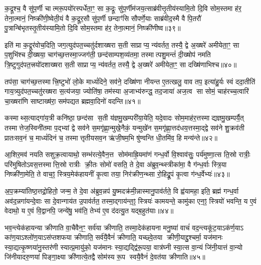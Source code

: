 {\anuvakamend[{प्रज्ञात्यै पश्यत्यनूया॒जव॒द्यज॑मा॒नोऽनु॑ पुरोनुवा॒क्यास्ता अ॒ष्टौ च॑॥५॥}]}

क॒द्रूश्च॒ वै सु॑प॒र्णी चात्मरू॒पयो॑रस्पर्धेता॒ꣳ॒ सा क॒द्रूः सु॑प॒र्णीम॑जय॒त्साब्र॑वीत्तृ॒तीय॑स्यामि॒तो दि॒वि सोम॒स्तमा ह॑र॒ तेना॒त्मानं॒ निष्क्री॑णी॒ष्वेती॒यं वै क॒द्रूर॒सौ सु॑प॒र्णी छन्दाꣳ॑सि सौपर्णे॒याः साब्र॑वीद॒स्मै वै पि॒तरौ॑ पु॒त्रान्बि॑भृतस्तृ॒तीय॑स्यामि॒तो दि॒वि सोम॒स्तमा ह॑र॒ तेना॒त्मानं॒ निष्क्री॑णीष्व॥३९॥

इति॑ मा क॒द्रूर॑वोच॒दिति॒ जग॒त्युद॑पत॒च्चतु॑र्दशाख्षरा स॒ती साप्राप्य॒ न्य॑वर्तत॒ तस्यै॒ द्वे अ॒ख्षरे॑ अमीयेता॒ꣳ॒ सा प॒शुभि॑श्च दी॒ख्षया॒ चाग॑च्छ॒त्तस्मा॒ज्जग॑ती॒ छन्द॑साम्पश॒व्य॑तमा॒ तस्मात्पशु॒मन्तं॑ दी॒ख्षोप॑ नमति त्रि॒ष्टुगुद॑पत॒त्त्रयो॑दशाख्षरा स॒ती साप्राप्य॒ न्य॑वर्तत॒ तस्यै॒ द्वे अ॒ख्षरे॑ अमीयेता॒ꣳ॒ सा दख्षि॑णाभिश्च॥४०॥

तप॑सा॒ चाग॑च्छ॒त्तस्मात्त्रि॒ष्टुभो॑ लो॒के माध्यं॑दिने॒ सव॑ने॒ दख्षि॑णा नीयन्त ए॒तत्खलु॒ वाव तप॒ इत्या॑हु॒र्यः स्वं ददा॒तीति॑ गाय॒त्र्युद॑पत॒च्चतु॑रख्षरा स॒त्य॑जया॒ ज्योति॑षा॒ तम॑स्या अ॒जाभ्य॑रुन्द्ध॒ तद॒जाया॑ अज॒त्व सा सोमं॒ चाह॑रच्च॒त्वारि॑ चा॒ख्षरा॑णि साष्टाख्ष॑रा॒ सम॑पद्यत ब्रह्मवा॒दिनो॑ वदन्ति॥४१॥

कस्माथ्स॒त्याद्गा॑य॒त्री कनि॑ष्ठा॒ छन्द॑सा स॒ती य॑ज्ञमु॒खम्परी॑या॒येति॒ यदे॒वादः सोम॒माह॑र॒त्तस्माद्यज्ञमु॒खम्पर्यै॒त् तस्मात्तेज॒स्विनी॑तमा प॒द्भ्यां द्वे सव॑ने स॒मगृ॑ह्णा॒न्मुखे॒नैकं॒ यन्मुखे॑न स॒मगृ॑ह्णा॒त्तद॑धय॒त्तस्मा॒द्द्वे सव॑ने शु॒क्रव॑ती प्रातःसव॒नं च॒ माध्यं॑दिनं च॒ तस्मात्तृतीयसव॒न ऋ॑जी॒षम॒भि षु॑ण्वन्ति धी॒तमि॑व॒ हि मन्य॑न्ते॥४२॥

आ॒शिर॒मव॑ नयति सशुक्र॒त्वायाथो॒ सम्भ॑रत्ये॒वैन॒त्त सोम॑माह्रि॒यमा॑णं गन्ध॒र्वो वि॒श्वाव॑सुः॒ पर्य॑मुष्णा॒त्स ति॒स्रो रात्रीः॒ परि॑मुषितोऽवस॒त्तस्मात्ति॒स्रो रात्रीः क्री॒तः सोमो॑ वसति॒ ते दे॒वा अ॑ब्रुव॒न्थ्स्त्रीका॑मा॒ वै ग॑न्ध॒र्वाः स्त्रि॒या निष्क्री॑णा॒मेति॒ ते वाच॒ꣵ॒ स्त्रिय॒मेक॑हायनीं कृ॒त्वा तया॒ निर॑क्रीण॒न्थ्सा रो॒हिद्रू॒पं कृ॒त्वा ग॑न्ध॒र्वेभ्यः॑॥४३॥

अ॒प॒क्रम्या॑तिष्ठ॒त्तद्रो॒हितो॒ जन्म॒ ते दे॒वा अ॑ब्रुव॒न्नप॑ यु॒ष्मदक्र॑मी॒न्नास्मानु॒पाव॑र्तते॒ वि ह्व॑यामहा॒ इति॒ ब्रह्म॑ गन्ध॒र्वा अव॑द॒न्नगा॑यन्दे॒वाः सा दे॒वान्गाय॑त उ॒पाव॑र्तत॒ तस्मा॒द्गाय॑न्त॒ꣵ॒ स्त्रियः॑ कामयन्ते॒ कामु॑का एन॒ꣵ॒ स्त्रियो॑ भवन्ति॒ य ए॒वं वेदाथो॒ य ए॒वं वि॒द्वानपि॒ जन्ये॑षु॒ भव॑ति॒ तेभ्य॑ ए॒व द॑दत्यु॒त यद्ब॒हुत॑याः॥४४॥

भव॒न्त्येक॑हायन्या क्रीणाति वा॒चैवैन॒ꣳ॒ सर्व॑या क्रीणाति॒ तस्मा॒देक॑हायना मनु॒ष्या॑ वाचं॑ वद॒न्त्यकू॑ट॒याऽक॑र्ण॒याऽ का॑ण॒याऽश्लो॑ण॒याऽस॑प्तशफया क्रीणाति॒ सर्व॑यै॒वैनं॑ क्रीणाति॒ यच्छ्वे॒तया क्रीणी॒याद्दु॒श्चर्मा॒ यज॑मानः स्या॒द्यत्कृ॒ष्णया॑नु॒स्तर॑णी स्यात्प्र॒मायु॑को॒ यज॑मानः स्या॒द्यद्द्वि॑रू॒पया॒ वात्र॑घ्नी स्या॒त्स वा॒न्यं जि॑नी॒यात्तं वा॒न्यो जि॑नीयादरु॒णया॑ पिङ्गा॒क्ष्या क्री॑णात्ये॒तद्वै सोम॑स्य रू॒प स्वयै॒वैनं॑ दे॒वत॑या क्रीणाति॥४५॥

